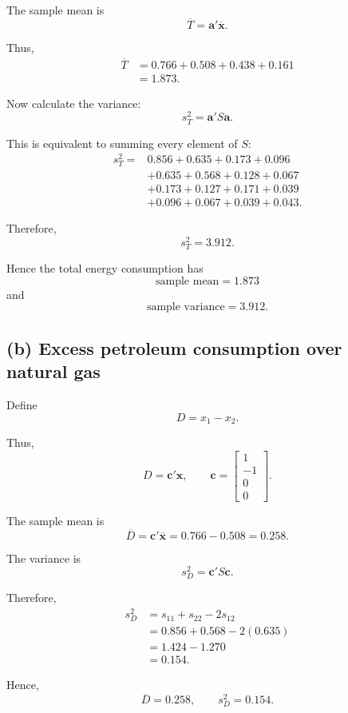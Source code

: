 \documentclass[12pt,a4paper]{article}
\begin{document}
The sample mean is
\[
\overline{T}
=
\mathbf{a}'\overline{\mathbf{x}}.
\]

Thus,
\[
\begin{aligned}
\overline{T}
&=
0.766+0.508+0.438+0.161\\
&=
\boxed{1.873}.
\end{aligned}
\]

Now calculate the variance:
\[
s_T^2=\mathbf{a}'S\mathbf{a}.
\]

This is equivalent to summing every element of \(S\):
\[
\begin{aligned}
s_T^2
={}&
0.856+0.635+0.173+0.096\\
&+0.635+0.568+0.128+0.067\\
&+0.173+0.127+0.171+0.039\\
&+0.096+0.067+0.039+0.043.
\end{aligned}
\]

Therefore,
\[
\boxed{s_T^2=3.912}.
\]

Hence the total energy consumption has
\[
\boxed{\text{sample mean}=1.873}
\]
and
\[
\boxed{\text{sample variance}=3.912}.
\]

\subsection*{(b) Excess petroleum consumption over natural gas}

Define
\[
D=x_1-x_2.
\]

Thus,
\[
D=\mathbf{c}'\mathbf{x},
\qquad
\mathbf{c}
=
\begin{bmatrix}
1\\-1\\0\\0
\end{bmatrix}.
\]

The sample mean is
\[
\overline{D}
=
\mathbf{c}'\overline{\mathbf{x}}
=
0.766-0.508
=
\boxed{0.258}.
\]

The variance is
\[
s_D^2=\mathbf{c}'S\mathbf{c}.
\]

Therefore,
\[
\begin{aligned}
s_D^2
&=
s_{11}+s_{22}-2s_{12}\\
&=
0.856+0.568-2(0.635)\\
&=
1.424-1.270\\
&=
\boxed{0.154}.
\end{aligned}
\]

Hence,
\[
\boxed{\overline{D}=0.258},
\qquad
\boxed{s_D^2=0.154}.
\]
\end{document}
